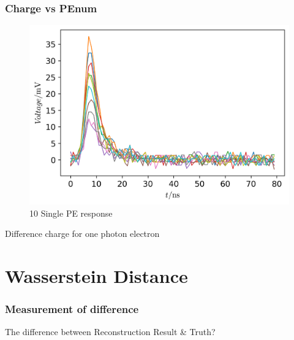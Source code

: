 \documentclass{beamer}
\begin{document}
\begin{frame}
\frametitle{Charge vs PEnum}
\setlength{\abovecaptionskip}{0mm}
\setlength{\belowcaptionskip}{0mm}
\begin{figure}
    \centering
    \caption{10 Single PE response}
    \includegraphics[width=0.8\linewidth]{img/spewaves.png}
\end{figure}
\vspace{-4mm}
\hspace{8mm}Difference charge for one photon electron
\end{frame}

\section{Wasserstein Distance}
\begin{frame}
\frametitle{Measurement of difference}
\begin{center}
    The difference between Reconstruction Result \& Truth?
\end{center}
\end{frame}
\end{document}
